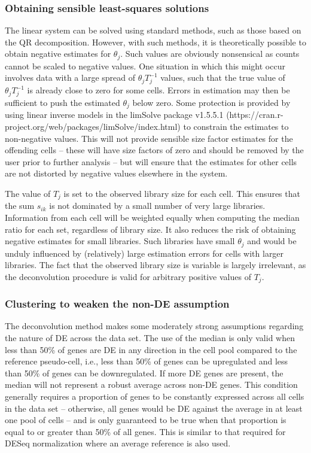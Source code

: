 \documentclass{bmcart}
\begin{document}
\subsubsection*{Obtaining sensible least-squares solutions}
The linear system can be solved using standard methods, such as those based on the QR decomposition.
However, with such methods, it is theoretically possible to obtain negative estimates for $\theta_j$.
Such values are obviously nonsensical as counts cannot be scaled to negative values.
One situation in which this might occur involves data with a large spread of $\theta_jT_j^{-1}$ values, 
    such that the true value of $\theta_jT_j^{-1}$ is already close to zero for some cells.
Errors in estimation may then be sufficient to push the estimated $\theta_j$ below zero.
Some protection is provided by using linear inverse models in the limSolve package v1.5.5.1 ({https://cran.r-project.org/web/packages/limSolve/index.html}) \cite{soetaert2009limsolve} to constrain the estimates to non-negative values.
This will not provide sensible size factor estimates for the offending cells -- these will have size factors of zero and should be removed by the user prior to further analysis --
    but will ensure that the estimates for other cells are not distorted by negative values elsewhere in the system.

The value of $T_j$ is set to the observed library size for each cell.
This ensures that the sum $s_{ik}$ is not dominated by a small number of very large libraries.
Information from each cell will be weighted equally when computing the median ratio for each set, regardless of library size.
It also reduces the risk of obtaining negative estimates for small libraries.
Such libraries have small $\theta_j$ and would be unduly influenced by (relatively) large estimation errors for cells with larger libraries.
The fact that the observed library size is variable is largely irrelevant, as the deconvolution procedure is valid for arbitrary positive values of $T_j$.

\subsubsection*{Clustering to weaken the non-DE assumption}
The deconvolution method makes some moderately strong assumptions regarding the nature of DE across the data set.
The use of the median is only valid when less than 50\% of genes are DE in any direction in the cell pool compared to the reference pseudo-cell,
    i.e., less than 50\% of genes can be upregulated and less than 50\% of genes can be downregulated.
If more DE genes are present, the median will not represent a robust average across non-DE genes.
This condition generally requires a proportion of genes to be constantly expressed across all cells in the data set 
    -- otherwise, all genes would be DE against the average in at least one pool of cells -- 
    and is only guaranteed to be true when that proportion is equal to or greater than 50\% of all genes.
This is similar to that required for DESeq normalization where an average reference is also used.
\end{document}

